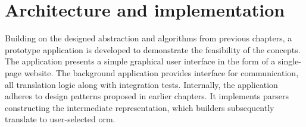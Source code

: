 \chapter{Architecture and implementation}












Building on the designed abstraction and algorithms from previous chapters, a prototype application is developed to demonstrate the feasibility of the concepts. The application presents a simple graphical user interface in the form of a single-page website. The background application provides interface for communication, all translation logic along with integration tests. Internally, the application adheres to design patterns proposed in earlier chapters. It implements parsers constructing the intermediate representation, which builders subsequently translate to user-selected \acrshort{orm}.

